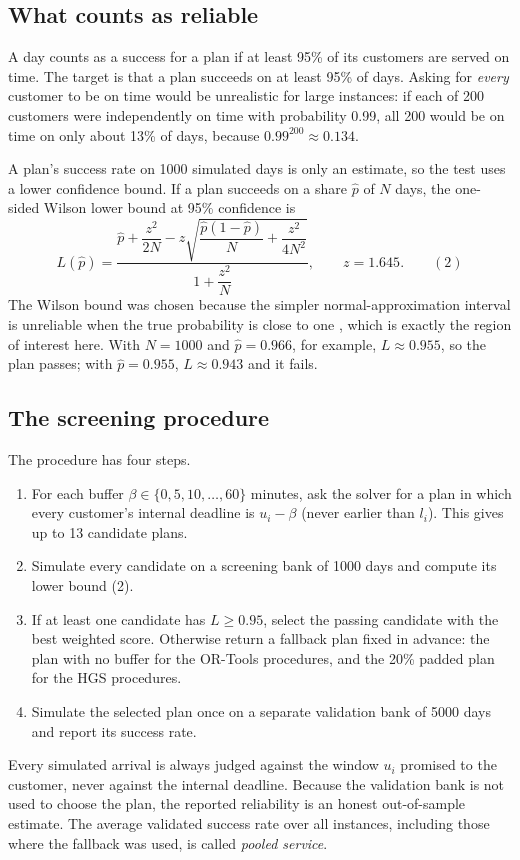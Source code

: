 \documentclass[12pt,letterpaper]{article}
\begin{document}
\subsection{What counts as reliable}

A day counts as a success for a plan if at least 95\% of its customers are served
on time. The target is that a plan succeeds on at least 95\% of days. Asking for
\emph{every} customer to be on time would be unrealistic for large instances: if
each of 200 customers were independently on time with probability 0.99, all 200
would be on time on only about 13\% of days, because $0.99^{200}\approx0.134$.

A plan's success rate on 1000 simulated days is only an estimate, so the test uses
a lower confidence bound. If a plan succeeds on a share $\hat p$ of $N$ days, the
one-sided Wilson lower bound \cite{wilson1927} at 95\% confidence is
\begin{equation}
 L(\hat p)=\frac{\hat p+\dfrac{z^2}{2N}-z\sqrt{\dfrac{\hat p(1-\hat p)}{N}+\dfrac{z^2}{4N^2}}}{1+\dfrac{z^2}{N}},
 \qquad z=1.645 .
 \qquad(2)
\end{equation}
The Wilson bound was chosen because the simpler normal-approximation interval is
unreliable when the true probability is close to one \cite{brown2001}, which is
exactly the region of interest here. With $N=1000$ and $\hat p=0.966$, for example,
$L\approx0.955$, so the plan passes; with $\hat p=0.955$, $L\approx0.943$ and it fails.

\subsection{The screening procedure}

The procedure has four steps.
\begin{enumerate}
\item For each buffer $\beta\in\{0,5,10,\ldots,60\}$ minutes, ask the solver for a
plan in which every customer's internal deadline is $u_i-\beta$ (never earlier than
$l_i$). This gives up to 13 candidate plans.
\item Simulate every candidate on a screening bank of 1000 days and compute its
lower bound (2).
\item If at least one candidate has $L\ge0.95$, select the passing candidate with
the best weighted score. Otherwise return a fallback plan fixed in advance: the
plan with no buffer for the OR-Tools procedures, and the 20\% padded plan for the
HGS procedures.
\item Simulate the selected plan once on a separate validation bank of 5000 days
and report its success rate.
\end{enumerate}
Every simulated arrival is always judged against the window $u_i$ promised to the
customer, never against the internal deadline. Because the validation bank is not
used to choose the plan, the reported reliability is an honest out-of-sample
estimate. The average validated success rate over all instances, including those
where the fallback was used, is called \emph{pooled service}.
\end{document}
